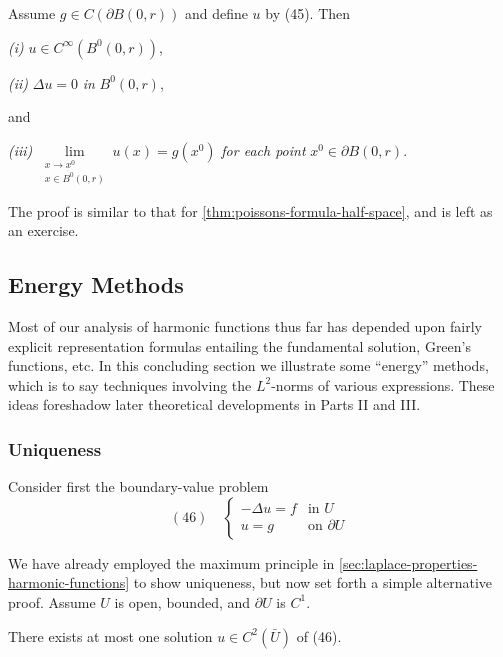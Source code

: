 \begin{theorem}
\label{thm:poissons-formula-ball}
Assume $g \in C(\partial B(0,r))$ and define $u$ by (45). Then

\textit{(i)} $u \in C^\infty(B^0(0,r))$,

\textit{(ii)} $\Delta u = 0$ \textit{in} $B^0(0,r)$,

and

\textit{(iii)} $\lim\limits_{\substack{x \to x^0 \\ x \in B^0(0,r)}} u(x) = g(x^0)$ \textit{for each point} $x^0 \in \partial B(0,r)$.
\end{theorem}

The proof is similar to that for \cref{thm:poissons-formula-half-space}, and is left as an exercise.

\subsection{Energy Methods}
\label{sec:laplace-energy-methods}

Most of our analysis of harmonic functions thus far has depended upon fairly explicit representation formulas entailing the fundamental solution, Green's functions, etc. In this concluding section we illustrate some ``energy'' methods, which is to say techniques involving the $L^2$-norms of various expressions. These ideas foreshadow later theoretical developments in Parts II and III.

\subsubsection{Uniqueness}
\label{sec:laplace-energy-uniqueness}

Consider first the boundary-value problem
$$(46) \quad \begin{cases} -\Delta u = f & \text{in } U \\ u = g & \text{on } \partial U \end{cases}$$

We have already employed the maximum principle in \cref{sec:laplace-properties-harmonic-functions} to show uniqueness, but now set forth a simple alternative proof. Assume $U$ is open, bounded, and $\partial U$ is $C^1$.

\begin{theorem}[Uniqueness]
\label{thm:uniqueness-poisson-energy-method}
There exists at most one solution $u \in C^2(\bar{U})$ of (46).
\end{theorem}

